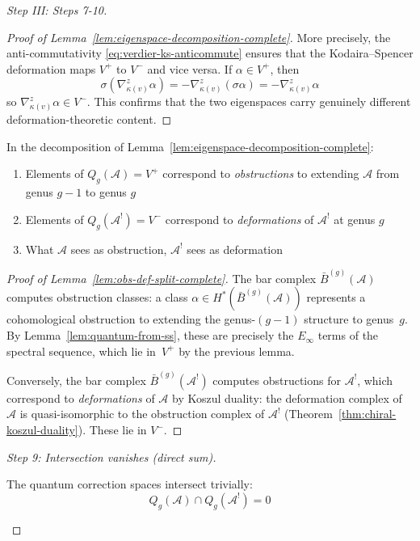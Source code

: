 \begin{proof}[Step III: Steps 7-10]
\begin{proof}[Proof of Lemma~\ref{lem:eigenspace-decomposition-complete}]
More precisely, the anti-commutativity
\eqref{eq:verdier-ks-anticommute} ensures that the Kodaira--Spencer
deformation maps $V^+$ to $V^-$ and vice versa.  If $\alpha \in V^+$,
then
\begin{equation}
\sigma(\nabla_{\kappa(v)}^z \alpha) = -\nabla_{\kappa(v)}^z (\sigma \alpha) =
-\nabla_{\kappa(v)}^z \alpha
\end{equation}
so $\nabla_{\kappa(v)}^z \alpha \in V^-$.  This confirms that the two eigenspaces
carry genuinely different deformation-theoretic content.
\end{proof}

\begin{lemma}
\label{lem:obs-def-split-complete}
In the decomposition of Lemma~\ref{lem:eigenspace-decomposition-complete}:
\begin{enumerate}
\item Elements of $Q_g(\mathcal{A}) = V^+$ correspond to \emph{obstructions}
to extending $\mathcal{A}$ from genus $g-1$ to genus $g$
\item Elements of $Q_g(\mathcal{A}^!) = V^-$ correspond to \emph{deformations}
of $\mathcal{A}^!$ at genus $g$
\item What $\mathcal{A}$ sees as obstruction, $\mathcal{A}^!$ sees as deformation
\end{enumerate}
\end{lemma}

\begin{proof}[Proof of Lemma~\ref{lem:obs-def-split-complete}]
The bar complex $\bar{B}^{(g)}(\mathcal{A})$ computes obstruction
classes: a class
$\alpha \in H^*(\bar{B}^{(g)}(\mathcal{A}))$
represents a cohomological obstruction to extending the
genus-$(g{-}1)$ structure to genus~$g$.  By
Lemma~\ref{lem:quantum-from-ss}, these are precisely the
$E_\infty$ terms of the spectral sequence, which lie in~$V^+$
by the previous lemma.

Conversely, the bar complex $\bar{B}^{(g)}(\mathcal{A}^!)$ computes obstructions
for $\mathcal{A}^!$, which correspond to \emph{deformations} of $\mathcal{A}$
by Koszul duality: the deformation complex of $\mathcal{A}$ is quasi-isomorphic
to the obstruction complex of $\mathcal{A}^!$ (Theorem~\ref{thm:chiral-koszul-duality}).
These lie in $V^-$.
\end{proof}

\emph{Step 9: Intersection vanishes (direct sum).}

\begin{lemma}
\label{lem:trivial-intersection-complete}
The quantum correction spaces intersect trivially:
\begin{equation}
Q_g(\mathcal{A}) \cap Q_g(\mathcal{A}^!) = 0
\end{equation}
\end{lemma}


\end{proof}
